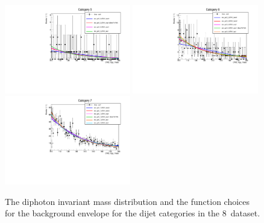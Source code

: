 \begin{figure}
  \includegraphics[width=0.49\textwidth]{ch5_anal_and_results/plots/mva_8TeV/multipdf_cat5.pdf}
  \includegraphics[width=0.49\textwidth]{ch5_anal_and_results/plots/mva_8TeV/multipdf_cat6.pdf}\\
  \includegraphics[width=0.49\textwidth]{ch5_anal_and_results/plots/mva_8TeV/multipdf_cat7.pdf}
  \caption{The diphoton invariant mass distribution and the function choices for the background envelope for the dijet categories in the 8~\TeV dataset. }
  \label{fig:multipdf5}
\end{figure}

